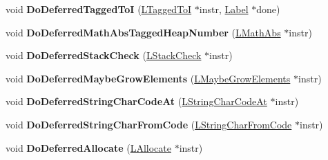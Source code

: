 \begin{DoxyCompactItemize}
\item 
void {\bfseries Do\+Deferred\+Tagged\+ToI} (\hyperlink{classv8_1_1internal_1_1_l_tagged_to_i}{L\+Tagged\+ToI} $\ast$instr, \hyperlink{classv8_1_1internal_1_1_label}{Label} $\ast$done)\hypertarget{classv8_1_1internal_1_1_l_code_gen_aaa65e08043bc6272e8615222cb34e25f}{}\label{classv8_1_1internal_1_1_l_code_gen_aaa65e08043bc6272e8615222cb34e25f}

\item 
void {\bfseries Do\+Deferred\+Math\+Abs\+Tagged\+Heap\+Number} (\hyperlink{classv8_1_1internal_1_1_l_math_abs}{L\+Math\+Abs} $\ast$instr)\hypertarget{classv8_1_1internal_1_1_l_code_gen_aa6e5b6dba176a4572ce81dcc27b057aa}{}\label{classv8_1_1internal_1_1_l_code_gen_aa6e5b6dba176a4572ce81dcc27b057aa}

\item 
void {\bfseries Do\+Deferred\+Stack\+Check} (\hyperlink{classv8_1_1internal_1_1_l_stack_check}{L\+Stack\+Check} $\ast$instr)\hypertarget{classv8_1_1internal_1_1_l_code_gen_a273730f2504ea249d9deb8dde7b314ee}{}\label{classv8_1_1internal_1_1_l_code_gen_a273730f2504ea249d9deb8dde7b314ee}

\item 
void {\bfseries Do\+Deferred\+Maybe\+Grow\+Elements} (\hyperlink{classv8_1_1internal_1_1_l_maybe_grow_elements}{L\+Maybe\+Grow\+Elements} $\ast$instr)\hypertarget{classv8_1_1internal_1_1_l_code_gen_afe319c35fc8adaff35f3417fb7c833d6}{}\label{classv8_1_1internal_1_1_l_code_gen_afe319c35fc8adaff35f3417fb7c833d6}

\item 
void {\bfseries Do\+Deferred\+String\+Char\+Code\+At} (\hyperlink{classv8_1_1internal_1_1_l_string_char_code_at}{L\+String\+Char\+Code\+At} $\ast$instr)\hypertarget{classv8_1_1internal_1_1_l_code_gen_a6b229168338a73ef11c203f845b68cb4}{}\label{classv8_1_1internal_1_1_l_code_gen_a6b229168338a73ef11c203f845b68cb4}

\item 
void {\bfseries Do\+Deferred\+String\+Char\+From\+Code} (\hyperlink{classv8_1_1internal_1_1_l_string_char_from_code}{L\+String\+Char\+From\+Code} $\ast$instr)\hypertarget{classv8_1_1internal_1_1_l_code_gen_acf78c92290237e368a4b178f049afbc6}{}\label{classv8_1_1internal_1_1_l_code_gen_acf78c92290237e368a4b178f049afbc6}

\item 
void {\bfseries Do\+Deferred\+Allocate} (\hyperlink{classv8_1_1internal_1_1_l_allocate}{L\+Allocate} $\ast$instr)\hypertarget{classv8_1_1internal_1_1_l_code_gen_a5a708933d9b086e295c8bf902f66033e}{}\label{classv8_1_1internal_1_1_l_code_gen_a5a708933d9b086e295c8bf902f66033e}


\end{DoxyCompactItemize}
